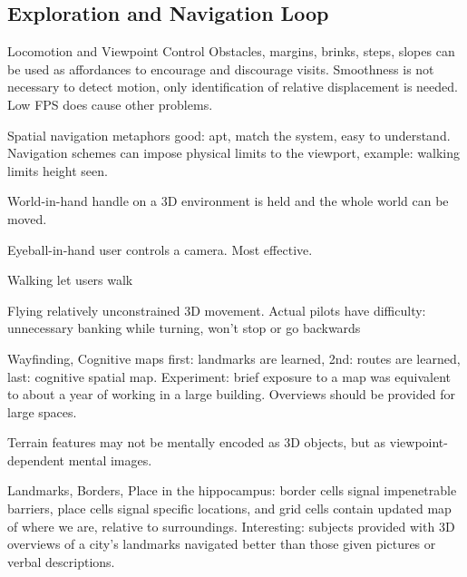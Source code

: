 \begin{mdframed}\begin{multicols}{2}
\subsection{Exploration and Navigation Loop}
\begin{compactdesc}
\item[Locomotion and Viewpoint Control]
    Obstacles, margins, brinks, steps, slopes can be used as affordances to
    encourage and discourage visits. Smoothness is not necessary to detect
    motion, only identification of relative displacement is needed. Low FPS
    does cause other problems.
\item[Spatial navigation metaphors] good: apt, match the system, easy to
    understand. Navigation schemes can impose physical limits to the
    viewport, example: walking limits height seen.
    \begin{compactdesc}
    \item[World-in-hand] handle on a 3D environment is held and the whole world
        can be moved.
    \item[Eyeball-in-hand] user controls a camera. Most effective.
    \item[Walking] let users walk
    \item[Flying] relatively unconstrained 3D movement. Actual pilots have
        difficulty: unnecessary banking while turning, won't stop or go
        backwards
    \end{compactdesc}
\item[Wayfinding, Cognitive maps] first: landmarks are learned, 2nd: routes are
    learned, last: cognitive spatial map. Experiment: brief exposure to a map
    was equivalent to about a year of working in a large building. Overviews
    should be provided for large spaces.
\item[Terrain features] may not be mentally encoded as 3D objects, but as
    viewpoint-dependent mental images.
\item[Landmarks, Borders, Place] in the hippocampus: border cells signal
    impenetrable barriers, place cells signal specific locations, and grid cells
    contain updated map of where we are, relative to surroundings.
    Interesting: subjects provided with 3D overviews of a city's landmarks
    navigated better than those given pictures or verbal descriptions.
\end{compactdesc}
\end{multicols}\end{mdframed}






